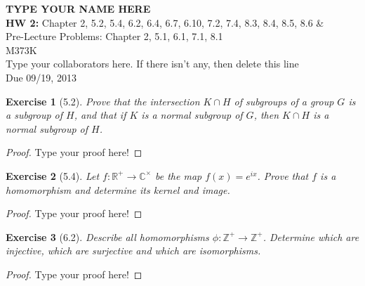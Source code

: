 \documentclass[12pt,leqno]{article}
\numberwithin{equation}{section}
\newtheorem*{exer}{Exercise}
\theoremstyle{definition}
\begin{document}
\thispagestyle{plain}
\begin{flushright}
\large{\textbf{TYPE YOUR NAME HERE \\}
\textbf{HW 2:} Chapter 2, 5.2, 5.4, 6.2, 6.4, 6.7, 6.10, 7.2, 7.4, 8.3, 8.4, 8.5, 8.6  \& \\
Pre-Lecture Problems: Chapter 2, 5.1, 6.1, 7.1, 8.1\\
M373K \\
Type your collaborators here. If there isn't any, then delete this line\\
Due 09/19, 2013 \\}
\end{flushright}

\markboth{}{} \setcounter{section}{0} \baselineskip=18pt

\setcounter{tocdepth}{4}


\begin{exer}[5.2]
Prove that the intersection $K \cap H $ of subgroups of a group $G$ is a subgroup of $H$, and that if $K$ is a normal subgroup of $G$, then $K \cap H$ is a normal subgroup of $H$.  
\end{exer}

\begin{proof}[Proof]
Type your proof here!
\end{proof}


\begin{exer}[5.4]
Let $f:\mathbb R^{+} \rightarrow \mathbb C^{\times}$ be the map $f(x)=e^{ix}$. Prove that $f$ is a homomorphism and determine its kernel and image.
\end{exer}

\begin{proof}[Proof]
Type your proof here!
\end{proof}

\begin{exer}[6.2]
Describe all homomorphisms $\phi: \mathbb Z^{+} \rightarrow \mathbb Z^+$. Determine which are injective, which are surjective and which are isomorphisms.
\end{exer}

\begin{proof}[Proof]
Type your proof here!
\end{proof}
\end{document}
